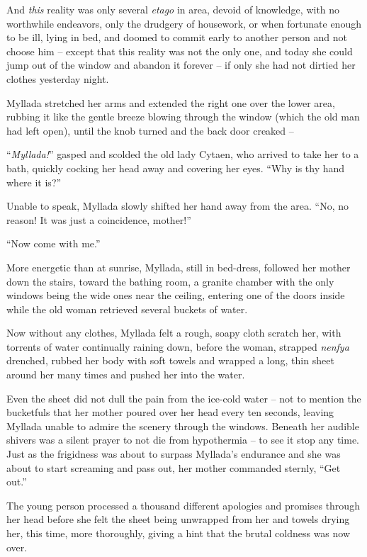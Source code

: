 And \emph{this} reality was only several \emph{etago} in area, devoid of knowledge, with no worthwhile endeavors, only the drudgery of housework, or when fortunate enough to be ill, lying in bed, and doomed to commit early to another person and not choose him -- except that this reality was not the only one, and today she could jump out of the window and abandon it forever -- if only she had not dirtied her clothes yesterday night.

Myllada stretched her arms and extended the right one over the lower area, rubbing it like the gentle breeze blowing through the window (which the old man had left open), until the knob turned and the back door creaked --

``\emph{Myllada!}'' gasped and scolded the old lady Cytaen, who arrived to take her to a bath, quickly cocking her head away and covering her eyes. ``Why is thy hand where it is?''

Unable to speak, Myllada slowly shifted her hand away from the area. ``No, no reason! It was just a coincidence, mother!''

``Now come with me.''

More energetic than at sunrise, Myllada, still in bed-dress, followed her mother down the stairs, toward the bathing room, a granite chamber with the only windows being the wide ones near the ceiling, entering one of the doors inside while the old woman retrieved several buckets of water.

Now without any clothes, Myllada felt a rough, soapy cloth scratch her, with torrents of water continually raining down, before the woman, strapped \emph{nenfya} drenched, rubbed her body with soft towels and wrapped a long, thin sheet around her many times and pushed her into the water.

Even the sheet did not dull the pain from the ice-cold water -- not to mention the bucketfuls that her mother poured over her head every ten seconds, leaving Myllada unable to admire the scenery through the windows. Beneath her audible shivers was a silent prayer to not die from hypothermia -- to see it stop any time. Just as the frigidness was about to surpass Myllada's endurance and she was about to start screaming and pass out, her mother commanded sternly, ``Get out.''

The young person processed a thousand different apologies and promises through her head before she felt the sheet being unwrapped from her and towels drying her, this time, more thoroughly, giving a hint that the brutal coldness was now over.

